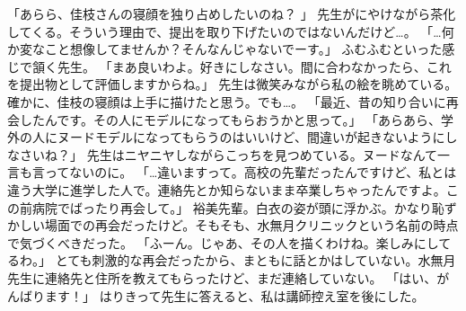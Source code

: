 「あらら、佳枝さんの寝顔を独り占めしたいのね？ 」
先生がにやけながら茶化してくる。そういう理由で、提出を取り下げたいのではないんだけど…。
「…何か変なこと想像してませんか？そんなんじゃないでーす。」
ふむふむといった感じで頷く先生。
「まあ良いわよ。好きにしなさい。間に合わなかったら、これを提出物として評価しますからね。」
先生は微笑みながら私の絵を眺めている。確かに、佳枝の寝顔は上手に描けたと思う。でも…。
「最近、昔の知り合いに再会したんです。その人にモデルになってもらおうかと思って。」
「あらあら、学外の人にヌードモデルになってもらうのはいいけど、間違いが起きないようにしなさいね？」
先生はニヤニヤしながらこっちを見つめている。ヌードなんて一言も言ってないのに。
「…違いますって。高校の先輩だったんですけど、私とは違う大学に進学した人で。連絡先とか知らないまま卒業しちゃったんですよ。この前病院でばったり再会して。」
裕美先輩。白衣の姿が頭に浮かぶ。かなり恥ずかしい場面での再会だったけど。そもそも、水無月クリニックという名前の時点で気づくべきだった。
「ふーん。じゃあ、その人を描くわけね。楽しみにしてるわ。」
とても刺激的な再会だったから、まともに話とかはしていない。水無月先生に連絡先と住所を教えてもらったけど、まだ連絡していない。
「はい、がんばります！」
はりきって先生に答えると、私は講師控え室を後にした。

